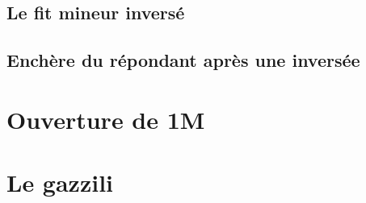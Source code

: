 \documentclass[a4paper]{article}
\begin{document}
\subsection{Le fit mineur inversé}

\subsection{Enchère du répondant après une inversée}

\section{Ouverture de 1M}

\section{Le gazzili}
\end{document}
